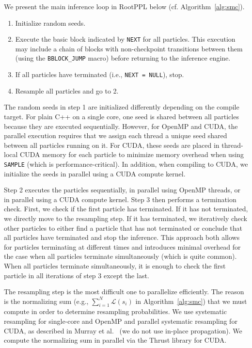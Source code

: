 \documentclass[runningheads]{llncs}
\newcommand{\rlstinline}{\lstinline[language=RootPPL]}
\begin{document}
We present the main inference loop in RootPPL below (cf. Algorithm~\ref{alg:smc}).
\begin{enumerate}
  \item Initialize random seeds.
  \item Execute the basic block indicated by \rlstinline!NEXT! for all particles. This execution may include a chain of blocks with non-checkpoint transitions between them (using the \rlstinline!BBLOCK_JUMP! macro) before returning to the inference engine.
  \item If all particles have terminated (i.e., \rlstinline!NEXT = NULL!), stop.
  \item Resample all particles and go to 2.
\end{enumerate}
The random seeds in step 1 are initialized differently depending on the compile target.
For plain C++ on a single core, one seed is shared between all particles because they are executed sequentially.
However, for OpenMP and CUDA, the parallel execution requires that we assign each thread a unique seed shared between all particles running on it.
For CUDA, these seeds are placed in thread-local CUDA memory for each particle to minimize memory overhead when using \rlstinline!SAMPLE! (which is performance-critical).
In addition, when compiling to CUDA, we initialize the seeds in parallel using a CUDA compute kernel.

Step 2 executes the particles sequentially, in parallel using OpenMP threads, or in parallel using a CUDA compute kernel.
Step 3 then performs a termination check.
First, we check if the first particle has terminated.
If it has not terminated, we directly move to the resampling step.
If it has terminated, we iteratively check other particles to either find a particle that has not terminated or conclude that all particles have terminated and stop the inference.
This approach both allows for particles terminating at different times and introduces minimal overhead for the case when all particles terminate simultaneously (which is quite common).
When all particles terminate simultaneously, it is enough to check the first particle in all iterations of step 3 except the last.

The resampling step is the most difficult one to parallelize efficiently.
The reason is the normalizing sum (e.g., $\sum_{i=1}^N \mathcal{L}(s_i)$ in Algorithm~\ref{alg:smc}) that we must compute in order to determine resampling probabilities.
We use systematic resampling for single-core and OpenMP and parallel systematic resampling for CUDA, as described in Murray et al.~\cite{murray2016parallel} (we do not use in-place propagation).
We compute the normalizing sum in parallel via the Thrust library \cite{thrust2021} for CUDA.
\end{document}
